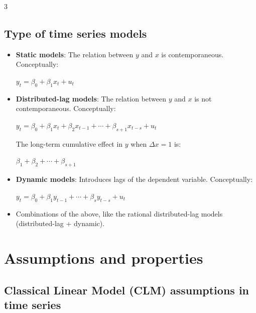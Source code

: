 \documentclass[10pt, a4paper, landscape]{article}
\begin{document}
\begin{multicols}{3}
\subsection*{Type of time series models}

\begin{itemize}[leftmargin=*]
	\item \textbf{Static models}: The relation between \( y \) and \( x \) is contemporaneous. Conceptually:
	\begin{center}
		\( y_{t} = \beta_{0} + \beta_{1} x_{t} + u_{t} \)
	\end{center}
	\item \textbf{Distributed-lag models}: The relation between \( y \) and \( x \) is not contemporaneous. Conceptually:
	\begin{center}
		\( y_{t} = \beta_{0} + \beta_{1} x_{t} + \beta_{2} x_{t - 1} + \cdots + \beta_{s + 1} x_{t - s} + u_{t} \)
	\end{center}
	The long-term cumulative effect in \( y \) when \( \Delta x = 1 \) is:
	\begin{center}
		\( \beta_{1} + \beta_{2} + \cdots + \beta_{s + 1} \)
	\end{center}
	\item \textbf{Dynamic models}: Introduces lags of the dependent variable. Conceptually:
	\begin{center}
		\( y_{t} = \beta_{0} + \beta_{1} y_{t - 1} + \cdots + \beta_{s} y_{t - s} + u_{t} \)
	\end{center}
		\item Combinations of the above, like the rational distributed-lag models (distributed-lag + dynamic).
\end{itemize}

\columnbreak

\section*{Assumptions and properties}

\subsection*{Classical Linear Model (CLM) assumptions in time series}


\end{multicols}
\end{document}
